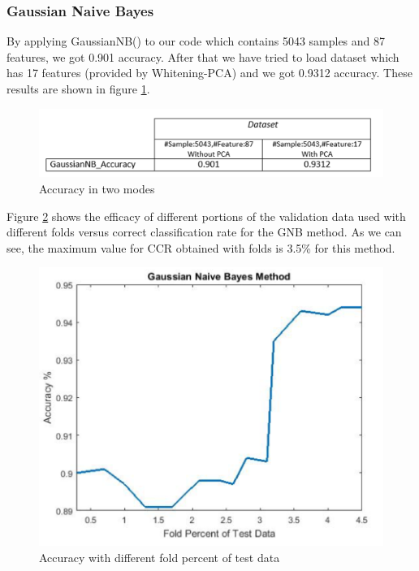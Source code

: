\documentclass[journal,transmag]{IEEEtran}
\begin{document}
			\subsubsection{Gaussian Naive Bayes}
By applying GaussianNB()  to our code which contains 5043 samples and 87 features, we got 0.901 accuracy. After that we have tried to load dataset which has 17 features (provided by Whitening-PCA) and we got 0.9312 accuracy. These results are shown in figure \ref{fig_foj1}.	
\begin{figure}
\includegraphics[scale=.26]{figfoj1}
 \caption{Accuracy in two modes}
\label{fig_foj1}
\end{figure}
Figure \ref{fig_foj2} shows the efficacy of different portions of the validation data used with different folds versus correct classification rate for the GNB method. As we can see, the maximum value for CCR obtained with folds is 3.5\% for this method. 
\begin{figure}
\includegraphics[scale=.38]{figfoj2}
 \caption{Accuracy with different fold percent of test data}
\label{fig_foj2}
\end{figure}
\end{document}
